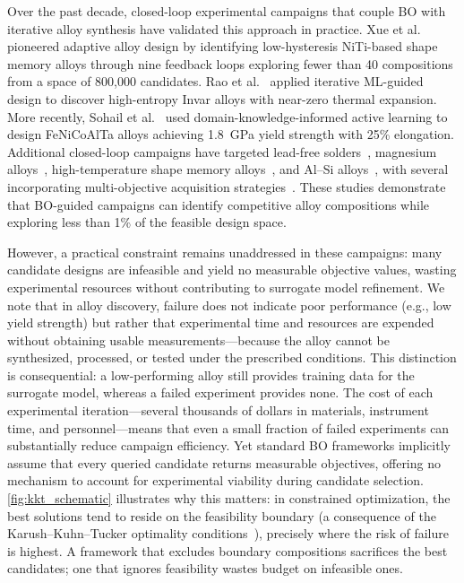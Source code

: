 
Over the past decade, closed-loop experimental campaigns that couple BO with iterative alloy synthesis have validated this approach in practice. Xue et al.~\cite{xue2016accelerated} pioneered adaptive alloy design by identifying low-hysteresis NiTi-based shape memory alloys through nine feedback loops exploring fewer than 40 compositions from a space of 800{,}000 candidates. Rao et al.~\cite{rao2022machine} applied iterative ML-guided design to discover high-entropy Invar alloys with near-zero thermal expansion. More recently, Sohail et al.~\cite{sohail2025machine} used domain-knowledge-informed active learning to design FeNiCoAlTa alloys achieving 1.8~GPa yield strength with 25\% elongation. Additional closed-loop campaigns have targeted lead-free solders~\cite{wei2025discovering}, magnesium alloys~\cite{ghorbani2024active}, high-temperature shape memory alloys~\cite{tian2024noise}, and Al--Si alloys~\cite{cai2025process}, with several incorporating multi-objective acquisition strategies~\cite{wei2025discovering, li2022strength}. These studies demonstrate that BO-guided campaigns can identify competitive alloy compositions while exploring less than 1\% of the feasible design space.


However, a practical constraint remains unaddressed in these campaigns: many candidate designs are infeasible and yield no measurable objective values, wasting experimental resources without contributing to surrogate model refinement. We note that in alloy discovery, failure does not indicate poor performance (e.g., low yield strength) but rather that experimental time and resources are expended without obtaining usable measurements---because the alloy cannot be synthesized, processed, or tested under the prescribed conditions. This distinction is consequential: a low-performing alloy still provides training data for the surrogate model, whereas a failed experiment provides none. The cost of each experimental iteration---several thousands of dollars in materials, instrument time, and personnel---means that even a small fraction of failed experiments can substantially reduce campaign efficiency. Yet standard BO frameworks implicitly assume that every queried candidate returns measurable objectives, offering no mechanism to account for experimental viability during candidate selection. \autoref{fig:kkt_schematic} illustrates why this matters: in constrained optimization, the best solutions tend to reside on the feasibility boundary (a consequence of the Karush--Kuhn--Tucker optimality conditions~\cite{nocedal2006numerical}), precisely where the risk of failure is highest. A framework that excludes boundary compositions sacrifices the best candidates; one that ignores feasibility wastes budget on infeasible ones.

